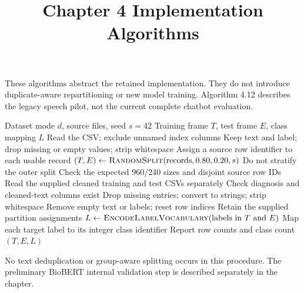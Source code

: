 \documentclass[11pt,a4paper]{article}
\title{Chapter 4 Implementation Algorithms}
\author{}
\date{}
\begin{document}
\maketitle
These algorithms abstract the retained implementation. They do not introduce
duplicate-aware repartitioning or new model training. Algorithm 4.12 describes
the legacy speech pilot, not the current complete chatbot evaluation.
\begin{algorithm}[H]
\caption{Load prepared text data and retain the experiment partitions}
\label{alg:data}
\begin{algorithmic}[1]
\Require Dataset mode $d$, source files, seed $s=42$
\Ensure Training frame $T$, test frame $E$, class mapping $L$
  \State Read the CSV; exclude unnamed index columns
  \State Keep text and label; drop missing or empty values; strip whitespace
  \State Assign a source row identifier to each usable record
  \State $(T,E)\gets\Call{RandomSplit}{\text{records},0.80,0.20,s}$
  \State Do not stratify the outer split
  \State Check the expected 960/240 sizes and disjoint source row IDs
\Else
  \State Read the supplied cleaned training and test CSVs separately
    \State Check diagnosis and cleaned-text columns exist
    \State Drop missing entries; convert to strings; strip whitespace
    \State Remove empty text or labels; reset row indices
  \EndFor
  \State Retain the supplied partition assignments
\EndIf
\State $L\gets\Call{EncodeLabelVocabulary}{\text{labels in }T\text{ and }E}$
\State Map each target label to its integer class identifier
\State Report row counts and class count
\State \Return $(T,E,L)$
\end{algorithmic}
\end{algorithm}
No text deduplication or group-aware splitting occurs in this procedure.
The preliminary BioBERT internal validation step is described separately in the chapter.
\end{document}
